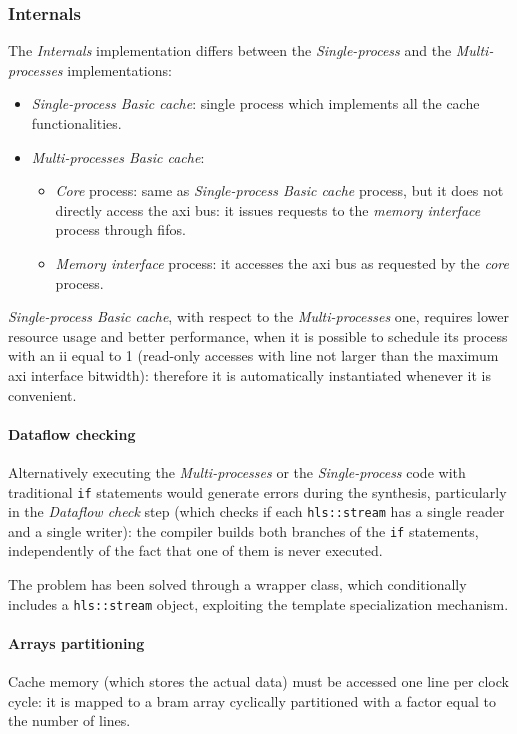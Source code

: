 \documentclass[11pt,a4paper,oneside]{memoir}
\begin{document}
\subsubsection{Internals}
The \emph{Internals} implementation differs between the \emph{Single-process}
and the \emph{Multi-processes} implementations:
\begin{itemize}
	\item \emph{Single-process Basic cache}: single process which
		implements all the cache functionalities.
	\item \emph{Multi-processes Basic cache}:
		\begin{itemize}
			\item \emph{Core} process: same as \emph{Single-process
				Basic cache} process, but it does not
				directly access the \ac{axi} bus: it issues
				requests to the \emph{memory interface} process
				through \acp{fifo}.
			\item \emph{Memory interface} process: it accesses the
				\ac{axi} bus as requested by the \emph{core}
				process.
		\end{itemize}
\end{itemize}

\emph{Single-process Basic cache}, with respect to the \emph{Multi-processes}
one, requires lower resource usage and better performance, when it is possible
to schedule its process with an \ac{ii} equal to 1 (read-only accesses with
line not larger than the maximum \ac{axi} interface bitwidth): therefore it is
automatically instantiated whenever it is convenient.

\paragraph{Dataflow checking}
Alternatively executing the \emph{Multi-processes} or the \emph{Single-process}
code with traditional \texttt{if} statements would generate errors during the
synthesis, particularly in the \emph{Dataflow check} step (which checks if each
\texttt{hls::stream} has a single reader and a single writer): the compiler
builds both branches of the \texttt{if} statements, independently of the fact
that one of them is never executed.

\bigskip
The problem has been solved through a wrapper class, which conditionally
includes a \texttt{hls::stream} object, exploiting the template specialization
mechanism.

\paragraph{Arrays partitioning}
Cache memory (which stores the actual data) must be accessed one line per clock
cycle: it is mapped to a \ac{bram} array cyclically partitioned with a factor
equal to the number of lines.
\end{document}
